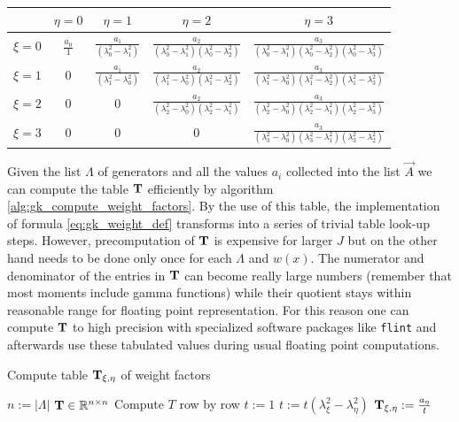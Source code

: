 \documentclass[a4paper,10pt]{article}
\begin{document}
\begin{center}
\begin{tabular}{|c|cccc|}
  \hline
  {}    & $\eta=0$ & $\eta=1$ & $\eta=2$ & $\eta=3$ \\
  \hline
  $\xi=0$ & $\frac{a_0}{1}$
          & $\frac{a_1}{(\lambda_0^2-\lambda_1^2)}$
          & $\frac{a_2}{(\lambda_0^2-\lambda_1^2)(\lambda_0^2-\lambda_2^2)}$
          & $\frac{a_3}{(\lambda_0^2-\lambda_1^2)(\lambda_0^2-\lambda_2^2)(\lambda_0^2-\lambda_3^2)}$ \\
  $\xi=1$ & 0
          & $\frac{a_1}{(\lambda_1^2-\lambda_0^2)}$
          & $\frac{a_2}{(\lambda_1^2-\lambda_0^2)(\lambda_1^2-\lambda_2^2)}$
          & $\frac{a_3}{(\lambda_1^2-\lambda_0^2)(\lambda_1^2-\lambda_2^2)(\lambda_1^2-\lambda_3^2)}$ \\
  $\xi=2$ & 0
          & 0
          & $\frac{a_2}{(\lambda_2^2-\lambda_0^2)(\lambda_2^2-\lambda_1^2)}$
          & $\frac{a_3}{(\lambda_2^2-\lambda_0^2)(\lambda_2^2-\lambda_1^2)(\lambda_2^2-\lambda_3^2)}$ \\
  $\xi=3$ & 0
          & 0
          & 0
          & $\frac{a_3}{(\lambda_3^2-\lambda_0^2)(\lambda_3^2-\lambda_1^2)(\lambda_3^2-\lambda_2^2)}$ \\
  \hline
\end{tabular}
\end{center}

Given the list $\Lambda$ of generators and all the values $a_{i}$ collected into
the list $\vec{A}$ we can compute the table $\mathbf{T}$ efficiently by algorithm
\eqref{alg:gk_compute_weight_factors}. By the use of this table, the implementation
of formula \eqref{eq:gk_weight_def} transforms into a series of trivial table
look-up steps. However, precomputation of $\mathbf{T}$ is expensive for larger $J$
but on the other hand needs to be done only once for each $\Lambda$ and $w(x)$.
The numerator and denominator of the entries in $\mathbf{T}$ can become really large
numbers (remember that most moments include gamma functions) while their quotient
stays within reasonable range for floating point representation. For this reason
one can compute $\mathbf{T}$ to high precision with specialized software packages
like \texttt{flint} \cite{flint, Hart2010} and afterwards use these tabulated
values during usual floating point computations.

\begin{algorithm}[h!]
  \caption{Compute table $\mathbf{T}_{\xi,\eta}$ of weight factors}
  \label{alg:gk_compute_weight_factors}
  \begin{algorithmic}
      \State $n := |\Lambda|$
      \State $\mathbf{T} \in \mathbb{R}^{n\times n}$
      \Comment Compute $T$ row by row
        \State $t := 1$
          \If{$\xi \neq \eta$}
            \State $t := t \left(\lambda_{\xi}^{2} - \lambda_{\eta}^{2}\right)$
          \EndIf
          \If{$\eta \geq \xi$}
            \State $\mathbf{T}_{\xi,\eta} := \frac{a_{\eta}}{t}$
          \EndIf
        \EndFor
      \EndFor
    \EndProcedure
  \end{algorithmic}
\end{algorithm}
\end{document}
